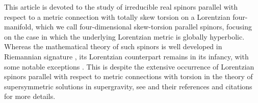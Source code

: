 \documentclass[10pt,reqno,a4paper]{amsart}
\theoremstyle{plain}
\theoremstyle{definition}
\theoremstyle{remark}
\theoremstyle{remark}
\renewcommand{\(}{ (}
\renewcommand{\)}{ )}
\begin{document}
%

This article is devoted to the study of irreducible real spinors parallel with respect to a metric connection with totally skew torsion on a Lorentzian four-manifold, which we call four-dimensional skew-torsion parallel spinors, focusing on the case in which the underlying Lorentzian metric is globally hyperbolic. Whereas the mathematical theory of such spinors is well developed in Riemannian signature \cite{AgricolaFriedrich,AgricolaSrni,FriedrichIvanov,IvanovPapadopoulos}, its Lorentzian counterpart remains in its infancy, with some notable exceptions \cite{ErnstGalaev,ErnstGalaevTwistorFree}. This is despite the extensive occurrence of Lorentzian spinors parallel with respect to metric connections with torsion in the theory of supersymmetric solutions in supergravity, see \cite{Gran:2018ijr,Ortin,Tomasiello} and their references and citations for more details. \medskip
\end{document}
